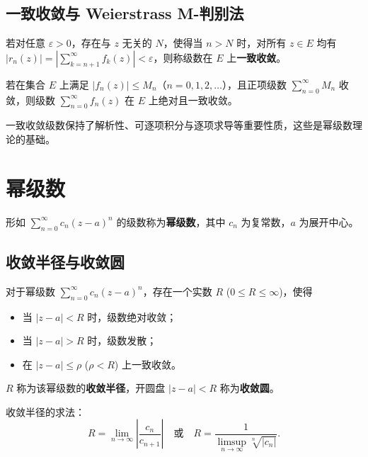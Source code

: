 \subsection{一致收敛与 Weierstrass M-判别法}

\begin{tcolorbox}[title=定义：一致收敛, colframe=blue!50!black, colback=blue!5!white, sharp corners]
	若对任意 $\varepsilon>0$，存在与 $z$ 无关的 $N$，使得当 $n>N$ 时，对所有 $z\in E$ 均有 $|r_n(z)| = \left|\sum_{k=n+1}^{\infty} f_k(z)\right| < \varepsilon$，则称级数在 $E$ 上\textbf{一致收敛}。
\end{tcolorbox}

\begin{tcolorbox}[title=定理：Weierstrass M-判别法, colframe=green!45!black, colback=green!5!white]
	若在集合 $E$ 上满足 $|f_n(z)| \le M_n$（$n=0,1,2,\dots$），且正项级数 $\sum_{n=0}^{\infty} M_n$ 收敛，则级数 $\sum_{n=0}^{\infty} f_n(z)$ 在 $E$ 上绝对且一致收敛。
\end{tcolorbox}

一致收敛级数保持了解析性、可逐项积分与逐项求导等重要性质，这些是幂级数理论的基础。

\section{幂级数}
形如 $\sum_{n=0}^{\infty} c_n (z-a)^n$ 的级数称为\textbf{幂级数}，其中 $c_n$ 为复常数，$a$ 为展开中心。

\subsection{收敛半径与收敛圆}

\begin{tcolorbox}[title=定理：Abel 定理, colframe=green!45!black, colback=green!5!white]
	对于幂级数 $\sum_{n=0}^{\infty} c_n (z-a)^n$，存在一个实数 $R$ ($0\le R\le\infty$)，使得
	\begin{itemize}
		\item 当 $|z-a| < R$ 时，级数绝对收敛；
		\item 当 $|z-a| > R$ 时，级数发散；
		\item 在 $|z-a| \le \rho$ ($\rho<R$) 上一致收敛。
	\end{itemize}
	$R$ 称为该幂级数的\textbf{收敛半径}，开圆盘 $|z-a|<R$ 称为\textbf{收敛圆}。
\end{tcolorbox}

收敛半径的求法：
\[
R = \lim_{n\to\infty} \left| \frac{c_n}{c_{n+1}} \right| \quad \text{或} \quad R = \frac{1}{\displaystyle\limsup_{n\to\infty} \sqrt[n]{|c_n|}}.
\]

